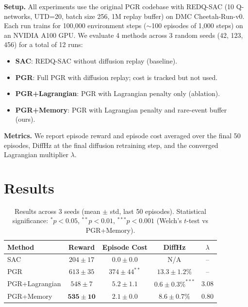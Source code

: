 \documentclass[11pt]{article}
\begin{document}
\textbf{Setup.}
All experiments use the original PGR codebase with REDQ-SAC (10 Q-networks, UTD=20, batch size 256, 1M replay buffer) on DMC Cheetah-Run-v0.
Each run trains for 100{,}000 environment steps (${\sim}$100 episodes of 1{,}000 steps) on an NVIDIA A100 GPU.
We evaluate 4 methods across 3 random seeds (42, 123, 456) for a total of 12 runs:

\begin{itemize}
    \item \textbf{SAC}: REDQ-SAC without diffusion replay (baseline).
    \item \textbf{PGR}: Full PGR with diffusion replay; cost is tracked but not used.
    \item \textbf{PGR+Lagrangian}: PGR with Lagrangian penalty only (ablation).
    \item \textbf{PGR+Memory}: PGR with Lagrangian penalty and rare-event buffer (ours).
\end{itemize}

\textbf{Metrics.}
We report episode reward and episode cost averaged over the final 50 episodes, DiffHz at the final diffusion retraining step, and the converged Lagrangian multiplier $\lambda$.

\section{Results}
\label{sec:results}

\begin{table}[h]
\centering
\caption{Results across 3 seeds (mean $\pm$ std, last 50 episodes). Statistical significance: $^{*}p{<}0.05$, $^{**}p{<}0.01$, $^{***}p{<}0.001$ (Welch's $t$-test vs PGR+Memory).}
\label{tab:results}
\begin{tabular}{lcccc}
\toprule
Method & Reward & Episode Cost & DiffHz & $\lambda$ \\
\midrule
SAC              & $204 \pm 17$  & $0.0 \pm 0.0$      & N/A            & -- \\
PGR              & $613 \pm 35$  & $374 \pm 44^{**}$   & $13.3 \pm 1.2\%$ & -- \\
PGR+Lagrangian   & $548 \pm 7$   & $5.2 \pm 1.1$       & $0.6 \pm 0.3\%^{***}$  & $3.08$ \\
PGR+Memory       & $\mathbf{535 \pm 10}$ & $\mathbf{2.1 \pm 0.0}$ & $\mathbf{8.6 \pm 0.7\%}$ & $\mathbf{0.80}$ \\
\bottomrule
\end{tabular}
\end{table}
\end{document}
